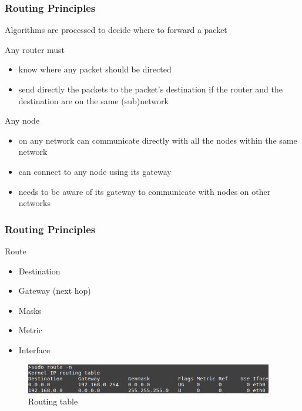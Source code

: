   \begin{frame}
    \frametitle{Routing Principles}
    Algorithms are processed to decide where to forward a packet
	\begin{block}{Any router must}
	  \begin{itemize}
	    \item know where any packet should be directed
	    \item send directly the packets to the packet's destination if the router and the destination are on the same (sub)network
	  \end{itemize}
        \end{block}
	\begin{block}{Any node}
	  \begin{itemize}
	    \item on any network can communicate directly with all the nodes within the same network
	    \item can connect to any node using its gateway
	    \item needs to be aware of its gateway to communicate with nodes on other networks
	  \end{itemize}
        \end{block}
  \end{frame}

  \begin{frame}
    \frametitle{Routing Principles}
	\begin{block}{Route}
	  \begin{itemize}
	    \item Destination
	    \item Gateway (next hop)
	    \item Masks
	    \item Metric
	    \item Interface
	  \end{itemize}
        \end{block}

	\begin{figure}[t]
          \centering
          \includegraphics[height=1.3cm]{./imgs/routing-table.png}
          \caption{Routing table}
          \label{fig:routing_table}
        \end{figure}
  \end{frame}

